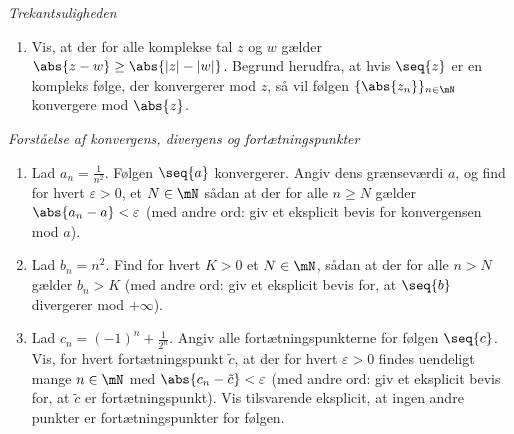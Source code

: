 \begin{opg} \emph{Trekantsuligheden}
\begin{enumerate}
%
%	
	\item Vis, at der for alle komplekse tal $z$ og $w$ gælder
	$\abs{z-w}\geq\abs{|z|-|w|}$. Begrund herudfra, at hvis $\seq{z}$ er en kompleks følge, der konvergerer mod $z$, så vil følgen $\{\abs{z_n}\}_{n \in \mN}$ konvergere mod $\abs{z}$.
\end{enumerate}
\end{opg}

\begin{opg} \emph{Forståelse af konvergens, divergens og fortætningspunkter}
\begin{enumerate}
    \item Lad $a_n= \frac {1}{n^2}$. Følgen $\seq{a}$ konvergerer. Angiv dens grænseværdi $a$, og find for hvert $\varepsilon>0$, et $N\in\mN$ sådan at der for alle $n \geq N$
	gælder $\abs{a_n-a} < \varepsilon$ (med andre ord: giv et eksplicit bevis for konvergensen mod $a$).
	
	\item Lad $b_n = n^2$. Find for hvert $K>0$ et $N\in\mN$, sådan at der
	for alle $n>N$ gælder $ b_n >K$ (med andre ord: giv et eksplicit bevis for, at $\seq{b}$ divergerer mod $+\infty$).
	
	\item Lad $c_n = (-1)^n + \frac{1}{2^n}$. Angiv alle fortætningspunkterne for følgen $\seq{c}$.  Vis, for hvert fortætningspunkt $\tilde{c}$, at der for hvert $\varepsilon>0$ findes uendeligt mange $n\in\mN$ med $\abs{c_n-\tilde{c}} <\varepsilon$ (med andre ord: giv et eksplicit bevis for, at $\tilde{c}$ er fortætningspunkt). Vis tilsvarende eksplicit, at ingen andre punkter er fortætningspunkter for følgen.
\end{enumerate}
\end{opg}



